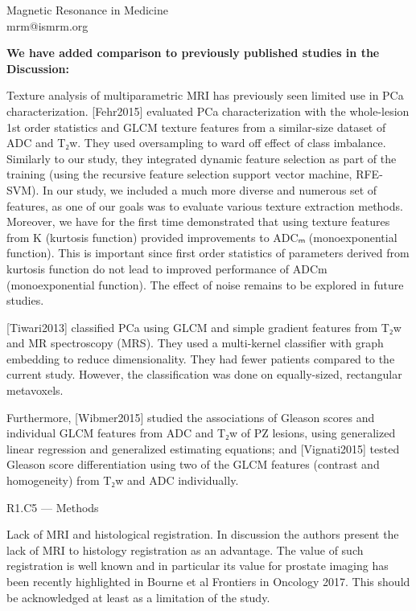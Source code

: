 \documentclass{letter}
\newenvironment{comment}[1]%
  {\vspace{5ex}\par\textsf{#1 ---} \ignorespaces}%
  {\par\ignorespacesafterend}
\newenvironment{reply}%
  {\vspace{2ex}\par\bfseries}%
  {\par\upshape}
\providecommand{\citet}[1]{[#1]}
\begin{document}
\begin{letter}{Magnetic Resonance in Medicine \\ mrm@ismrm.org}
\begin{reply}
We have added comparison to previously published studies in the Discussion:

Texture analysis of multiparametric MRI has previously seen limited use in PCa
characterization. \citet{Fehr2015} evaluated PCa characterization with the
whole-lesion 1st order statistics and GLCM texture features from a similar-size
dataset of ADC and T₂w. They used oversampling to ward off effect of class
imbalance. Similarly to our study, they integrated dynamic feature selection as
part of the training (using the recursive feature selection support vector
machine, RFE-SVM). In our study, we included a much more diverse and numerous
set of features, as one of our goals was to evaluate various texture extraction
methods. Moreover, we have for the first time demonstrated that using texture
features from K (kurtosis function) provided improvements to ADCₘ
(monoexponential function). This is important since first order statistics of
parameters derived from kurtosis function do not lead to improved performance of
ADCm (monoexponential function). The effect of noise remains to be explored in
future studies.

\citet{Tiwari2013} classified PCa using GLCM and simple gradient features from
T₂w and MR spectroscopy (MRS). They used a multi-kernel classifier with graph
embedding to reduce dimensionality. They had fewer patients compared to the
current study. However, the classification was done on equally-sized,
rectangular metavoxels.

Furthermore, \citet{Wibmer2015} studied the associations of Gleason scores and
individual GLCM features from ADC and T₂w of PZ lesions, using generalized
linear regression and generalized estimating equations; and \citet{Vignati2015}
tested Gleason score differentiation using two of the GLCM features (contrast
and homogeneity) from T₂w and ADC individually.
\end{reply}


\begin{comment}{R1.C5}
Methods

Lack of MRI and histological registration. In discussion the authors present the
lack of MRI to histology registration as an advantage. The value of such
registration is well known and in particular its value for prostate imaging has
been recently highlighted in Bourne et al Frontiers in Oncology 2017. This
should be acknowledged at least as a limitation of the study.
\end{comment}


\end{letter}
\end{document}

